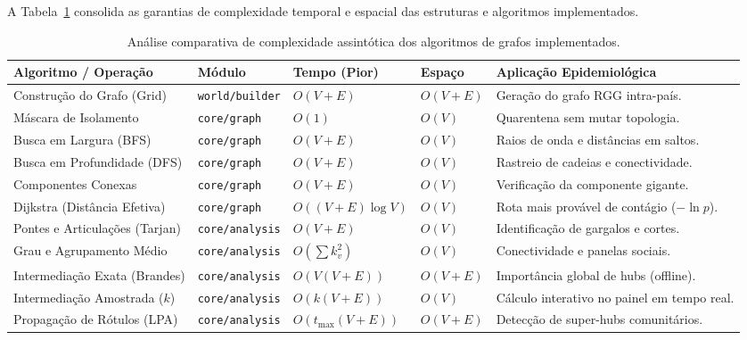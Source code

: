\documentclass[11pt]{article}
\begin{document}
A Tabela~\ref{tab:complexidade_algoritmos} consolida as garantias de complexidade temporal e espacial das estruturas e algoritmos implementados.

\begin{table}[!ht]
\centering
\caption{Análise comparativa de complexidade assintótica dos algoritmos de grafos implementados.}
\label{tab:complexidade_algoritmos}
\footnotesize
\setlength{\tabcolsep}{4pt}
\renewcommand{\arraystretch}{0.95}
\begin{tabular}{llllp{3.1cm}}
\hline
\textbf{Algoritmo / Operação} & \textbf{Módulo} & \textbf{Tempo (Pior)} & \textbf{Espaço} & \textbf{Aplicação Epidemiológica} \\
\hline
Construção do Grafo (Grid) & \texttt{world/builder} & $O(V + E)$ & $O(V + E)$ & Geração do grafo RGG intra-país. \\
Máscara de Isolamento & \texttt{core/graph} & $O(1)$ & $O(V)$ & Quarentena sem mutar topologia. \\
Busca em Largura (BFS) & \texttt{core/graph} & $O(V + E)$ & $O(V)$ & Raios de onda e distâncias em saltos. \\
Busca em Profundidade (DFS) & \texttt{core/graph} & $O(V + E)$ & $O(V)$ & Rastreio de cadeias e conectividade. \\
Componentes Conexas & \texttt{core/graph} & $O(V + E)$ & $O(V)$ & Verificação da componente gigante. \\
Dijkstra (Distância Efetiva) & \texttt{core/graph} & $O((V+E)\log V)$ & $O(V)$ & Rota mais provável de contágio ($-\ln p$). \\
Pontes e Articulações (Tarjan) & \texttt{core/analysis} & $O(V + E)$ & $O(V)$ & Identificação de gargalos e cortes. \\
Grau e Agrupamento Médio & \texttt{core/analysis} & $O(\sum k_v^2)$ & $O(V)$ & Conectividade e panelas sociais. \\
Intermediação Exata (Brandes) & \texttt{core/analysis} & $O(V(V + E))$ & $O(V + E)$ & Importância global de hubs (offline). \\
Intermediação Amostrada ($k$) & \texttt{core/analysis} & $O(k(V + E))$ & $O(V)$ & Cálculo interativo no painel em tempo real. \\
Propagação de Rótulos (LPA) & \texttt{core/analysis} & $O(t_{\max}(V + E))$ & $O(V + E)$ & Detecção de super-hubs comunitários. \\
\hline
\end{tabular}
\end{table}
\end{document}
